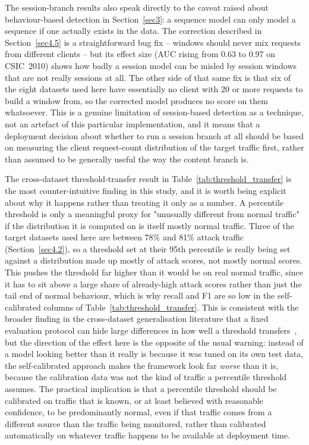 \documentclass[futureinternet,article,submit,moreauthors]{Definitions/mdpi}
\begin{document}
The session-branch results also speak directly to the caveat raised about behaviour-based detection in Section~\ref{sec3}: a sequence model can only model a sequence if one actually exists in the data. The correction described in Section~\ref{sec4.5} is a straightforward bug fix -- windows should never mix requests from different clients -- but its effect size (AUC rising from 0.63 to 0.97 on CSIC~2010) shows how badly a session model can be misled by session windows that are not really sessions at all. The other side of that same fix is that six of the eight datasets used here have essentially no client with 20 or more requests to build a window from, so the corrected model produces no score on them whatsoever. This is a genuine limitation of session-based detection as a technique, not an artefact of this particular implementation, and it means that a deployment decision about whether to run a session branch at all should be based on measuring the client request-count distribution of the target traffic first, rather than assumed to be generally useful the way the content branch is.

The cross-dataset threshold-transfer result in Table~\ref{tab:threshold_transfer} is the most counter-intuitive finding in this study, and it is worth being explicit about why it happens rather than treating it only as a number. A percentile threshold is only a meaningful proxy for "unusually different from normal traffic" if the distribution it is computed on is itself mostly normal traffic. Three of the target datasets used here are between 78\% and 81\% attack traffic (Section~\ref{sec4.2}), so a threshold set at their 95th percentile is really being set against a distribution made up mostly of attack scores, not mostly normal scores. This pushes the threshold far higher than it would be on real normal traffic, since it has to sit above a large share of already-high attack scores rather than just the tail end of normal behaviour, which is why recall and F1 are so low in the self-calibrated columns of Table~\ref{tab:threshold_transfer}. This is consistent with the broader finding in the cross-dataset generalisation literature that a fixed evaluation protocol can hide large differences in how well a threshold transfers~\cite{cantone2024}, but the direction of the effect here is the opposite of the usual warning: instead of a model looking better than it really is because it was tuned on its own test data, the self-calibrated approach makes the framework look far \emph{worse} than it is, because the calibration data was not the kind of traffic a percentile threshold assumes. The practical implication is that a percentile threshold should be calibrated on traffic that is known, or at least believed with reasonable confidence, to be predominantly normal, even if that traffic comes from a different source than the traffic being monitored, rather than calibrated automatically on whatever traffic happens to be available at deployment time.
\end{document}
